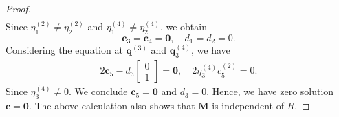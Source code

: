 \documentclass[10pt,a4paper]{amsart}
\newcommand{\bm}[1]{\boldsymbol{#1}}
\begin{document}
\begin{proof}
\begin{equation}
\begin{aligned}
    \end{aligned}
\end{equation}
Since $\eta_1^{(2)} \neq \eta_2^{(2)}$ and $\eta_1^{(4)} \neq \eta_2^{(4)}$, we obtain
\begin{equation}
    \bm c_3 = \bm c_4=\bm 0,\quad d_1 = d_2 = 0.
\end{equation}
Considering the equation at $\bm q^{(3)}$ and $\bm q_3^{(4)}$, we have
\begin{equation}
\begin{aligned}
    2\bm c_5 - d_3 
    \begin{bmatrix}
        0 \\
        1
    \end{bmatrix} = \bm 0,\quad
    2\eta_3^{(4)} c_5^{(2)} = 0.    
\end{aligned}
\end{equation}
Since $\eta_3^{(4)}\neq 0$. We conclude $\bm c_5 = \bm 0$ and $d_3 = 0$. 
Hence, we have zero solution $\bm c =\bm 0$.
The above calculation also shows that $\bm M$ is independent of $R$.
\end{proof}
\end{document}
